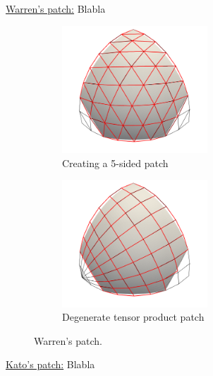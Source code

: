 \documentclass{article}
\begin{document}
\vspace{10pt}
\noindent\underline{Warren's patch:}\vspace{0.2em}\newline
Blabla
\begin{figure}[h!]
  \begin{subfigure}{0.45\textwidth}
    \centering
    \includegraphics[width = 0.6\textwidth]{images/warren-cnet.png}
    \caption{Creating a 5-sided patch}
    \label{fig:warren-cnet}
  \end{subfigure}
  \begin{subfigure}{0.45\textwidth}
    \centering
    \includegraphics[width = 0.6\textwidth]{images/warren-quad.png}
    \caption{Degenerate tensor product patch}
    \label{fig:warren-quad}
  \end{subfigure}
  \caption{Warren's patch.}
  \label{fig:warren}
\end{figure}

\vspace{10pt}
\noindent\underline{Kato's patch:}\vspace{0.2em}\newline
Blabla
\end{document}
